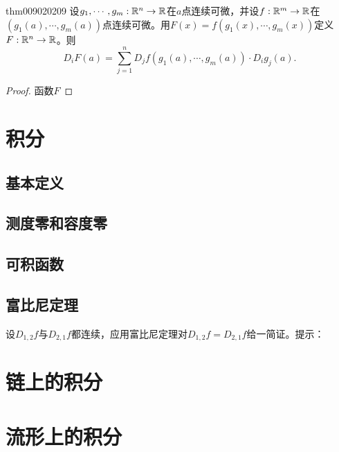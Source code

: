 \begin{theorem}{}{thm009020209}
设$g_1,\cdots,g_m:\mathbb{R}^n \to \mathbb{R}$在$a$点连续可微，并设$f:\mathbb{R}^m \to \mathbb{R}$在$(g_1(a),\cdots,g_m(a))$点连续可微。用$F(x) = f(g_1(x), \cdots, g_m(x))$定义$F:\mathbb{R}^n \to \mathbb{R}$。则
\[
D_iF(a) = \sum_{j=1}^{n}{D_jf(g_1(a),\cdots, g_m(a)) \cdot D_ig_j(a)}.
\]
\end{theorem}

\begin{proof}
函数$F$
\end{proof}

\chapter{积分}\label{chapter00903}
\section{基本定义}\label{section0090301}





\section{测度零和容度零}\label{section0090302}


\section{可积函数}\label{section0090303}


\section{富比尼定理}\label{section0090304}

\begin{problemset}
\item\label{exer009030328} 设$D_{1,2}f$与$D_{2,1}f$都连续，应用富比尼定理对$D_{1,2}f = D_{2,1}f$给一简证。提示：

\end{problemset}



\chapter{链上的积分}\label{chapter00904}




\chapter{流形上的积分}\label{chapter00905}

